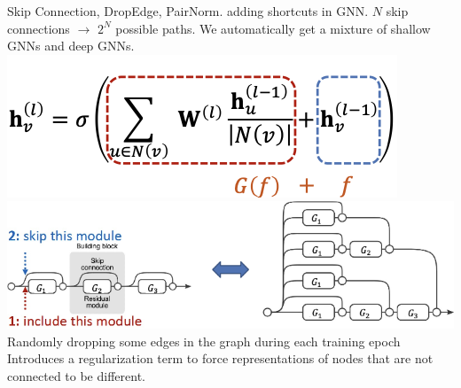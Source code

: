 Skip Connection, DropEdge, PairNorm.
 adding shortcuts in GNN. \( N \) skip connections \( \rightarrow \) \( 2^{N} \) possible paths. We automatically get a mixture of shallow GNNs and deep GNNs.
\includegraphics[height=0.025\textwidth]{figs/l6-6.png}
\includegraphics[height=0.025\textwidth]{figs/l6-7.png}
Randomly dropping some edges in the graph during each training epoch
 Introduces a regularization term to force representations of nodes that are not connected to be different.
